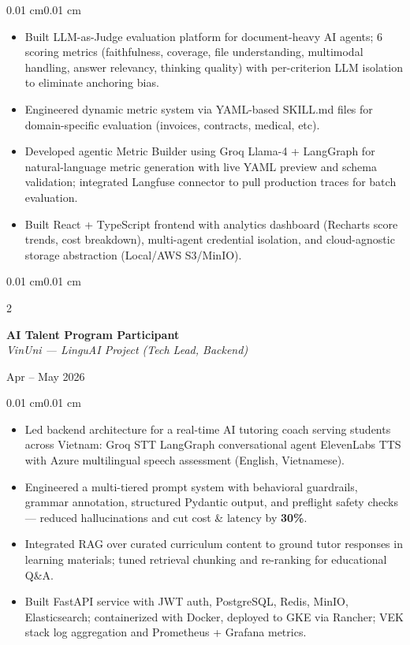 \documentclass[10pt, letterpaper]{article}
\newenvironment{highlights}{
    \begin{itemize}[
        topsep=0.05 cm,
        parsep=0.05 cm,
        partopsep=0pt,
        itemsep=0pt,
        leftmargin=0.35 cm
    ]
}{
    \end{itemize}
}
\newenvironment{onecolentry}{
    \begin{adjustwidth}{0.01 cm}{0.01 cm}
}{
    \end{adjustwidth}
}
\newenvironment{twocolentry}[2][]{
    \onecolentry
    \def\secondColumn{#2}
    \setcolumnwidth{\fill, 4.3 cm}
    \begin{paracol}{2}
}{
    \switchcolumn \raggedleft \secondColumn
    \end{paracol}
    \endonecolentry
}
\begin{document}
\begin{onecolentry}
\begin{highlights}
    \item Built LLM-as-Judge evaluation platform for document-heavy AI agents; 6 scoring metrics (faithfulness, coverage, file understanding, multimodal handling, answer relevancy, thinking quality) with per-criterion LLM isolation to eliminate anchoring bias.
    \item Engineered dynamic metric system via YAML-based SKILL.md files for domain-specific evaluation (invoices, contracts, medical, etc).
    \item Developed agentic Metric Builder using Groq Llama-4 + LangGraph for natural-language metric generation with live YAML preview and schema validation; integrated Langfuse connector to pull production traces for batch evaluation.
    \item Built React + TypeScript frontend with analytics dashboard (Recharts score trends, cost breakdown), multi-agent credential isolation, and cloud-agnostic storage abstraction (Local/AWS S3/MinIO).
\end{highlights}
\end{onecolentry}

\begin{twocolentry}{Apr -- May 2026}
    \textbf{AI Talent Program Participant} \\
    \textit{VinUni --- LinguAI Project (Tech Lead, Backend)}
\end{twocolentry}

\begin{onecolentry}
\begin{highlights}
    \item Led backend architecture for a real-time AI tutoring coach serving students across Vietnam: Groq STT \textrightarrow{} LangGraph conversational agent \textrightarrow{} ElevenLabs TTS with Azure multilingual speech assessment (English, Vietnamese).
    \item Engineered a multi-tiered prompt system with behavioral guardrails, grammar annotation, structured Pydantic output, and preflight safety checks — reduced hallucinations and cut cost \& latency by \textbf{30\%}.
    \item Integrated RAG over curated curriculum content to ground tutor responses in learning materials; tuned retrieval chunking and re-ranking for educational Q\&A.
    \item Built FastAPI service with JWT auth, PostgreSQL, Redis, MinIO, Elasticsearch; containerized with Docker, deployed to GKE via Rancher; VEK stack log aggregation and Prometheus + Grafana metrics.
\end{highlights}
\end{onecolentry}
\end{document}
